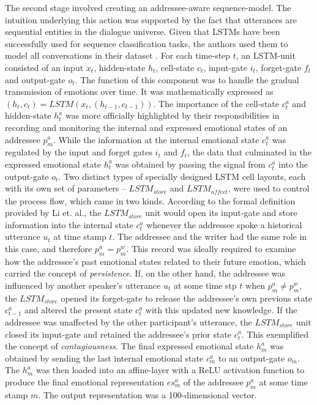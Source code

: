 The second stage involved creating an addressee-aware sequence-model. The intuition underlying this action was supported by the fact that utterances are sequential entities in the dialogue universe. Given that LSTMs have been successfully used for sequence classification tasks, the authors used them to model all conversations in their dataset \cite{Hochreiter1997LongSM}. For each time-step $t$, an LSTM-unit consisted of an input $x_t$, hidden-state $h_t$, cell-state $c_t$, input-gate $i_t$, forget-gate $f_t$ and output-gate $o_t$. The function of this component was to handle the gradual transmission of emotions over time. It was mathematically expressed as $(h_t,c_t) = LSTM(x_t, (h_{t-1},c_{t-1}))$. The importance of the cell-state $c^a_t$ and hidden-state $h^a_t$ was more officially highlighted by their responsibilities in recording and monitoring the internal and expressed emotional states of an addressee $p^a_m$. While the information at the internal emotional state $c^a_t$ was regulated by the input and forget gates $i_t$ and $f_t$, the data that culminated in the expressed emotional state $h^a_t$ was obtained by passing the signal from $c^a_t$ into the output-gate $o_t$. Two distinct types of specially designed LSTM cell layouts, each with its own set of parameters -- $LSTM_{store}$ and $\mathit{LSTM_{affect}}$, were used to control the process flow, which came in two kinds. According to the formal definition provided by Li et. al., the $LSTM_{store}$ unit would open its input-gate and store information into the internal state $c^a_t$ whenever the addressee spoke a historical utterance $u_t$ at time stamp $t$. The addressee and the writer had the same role in this case, and therefore $p^a_m = p^w_m$. This record was ideally required to examine how the addressee's past emotional states related to their future emotion, which carried the concept of \textit{persistence}. If, on the other hand, the addressee was influenced by another speaker's utterance $u_t$ at some time stp $t$ when $p^a_m \neq p^w_m$, the $LSTM_{store}$ opened its forget-gate to release the addressee's own previous state $c^a_{t-1}$ and altered the present state $c^a_t$ with this updated new knowledge. If the addressee was unaffected by the other participant's utterance, the $LSTM_{store}$ unit closed its input-gate and retained the addressee's prior state $c^a_t$. This exemplified the concept of \textit{contagiousness}. The final expressed emotional state $h^a_m$ was obtained by sending the last internal emotional state $c^a_m$ to an output-gate $o_m$. The $h^a_m$ was then loaded into an affine-layer with a ReLU activation function to produce the final emotional representation $es^a_m$ of the addressee $p^a_m$ at some time stamp $m$. The output representation was a 100-dimensional vector.

